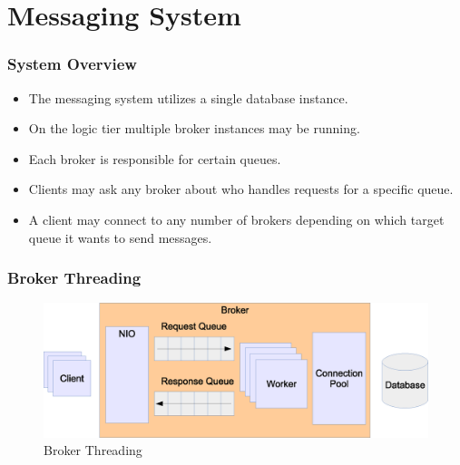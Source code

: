\documentclass{beamer}
\begin{document}
\section{Messaging System}

\begin{frame}
\frametitle{System Overview}
\begin{itemize}
\item The messaging system utilizes a single database instance. 
\item On the logic tier multiple broker instances may be running. 
\item Each broker is responsible for certain queues.
\item Clients may ask any broker about who handles requests for a specific queue.
\item A client may connect to any number of brokers depending on which target queue it wants to send messages.
\end{itemize}
\end{frame}




\begin{frame}
\frametitle{Broker Threading}
\begin{figure}
  \begin{center}
    \includegraphics[scale=0.42]{../../drawings/broker-threading.eps}
  \end{center}
  \caption{Broker Threading}
  \label{fig:broker-threading}
\end{figure}


\end{frame}


\end{document}
